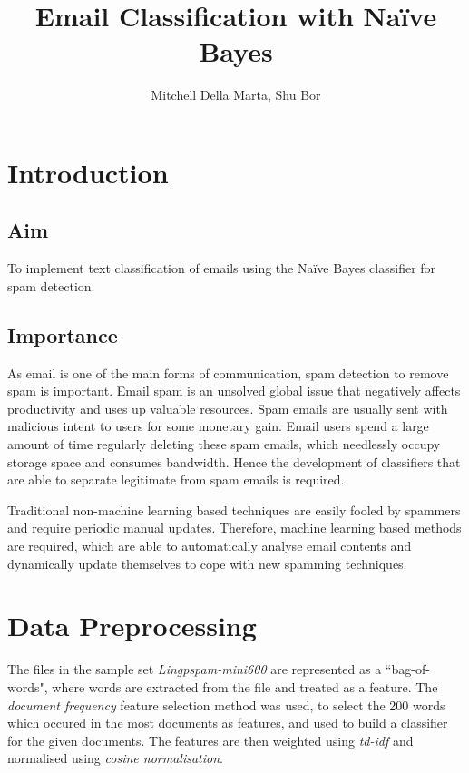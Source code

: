 \documentclass[10pt, a4paper]{article}
\title{Email Classification with Na\"ive Bayes}
\author{Mitchell Della Marta, Shu Bor}
\date{}
\begin{document}
\renewcommand\thetable{\Roman{table}}

\maketitle

\section{Introduction}

\subsection{Aim}

To implement text classification of emails using the Na\"ive Bayes classifier for spam detection.

\subsection{Importance}

As email is one of the main forms of communication, spam detection to remove spam is important. Email spam is an unsolved global issue that negatively affects productivity and uses up valuable resources. Spam emails are usually sent with malicious intent to users for some monetary gain. Email users spend a large amount of time regularly deleting these spam emails, which needlessly occupy storage space and consumes bandwidth. Hence the development of classifiers that are able to separate legitimate from spam emails is required. %

Traditional non-machine learning based techniques are easily fooled by spammers and require periodic manual updates. Therefore, machine learning based methods are required, which are able to automatically analyse email contents and dynamically update themselves to cope with new spamming techniques.

\section{Data Preprocessing}

The files in the sample set \emph{Lingpspam-mini600} are represented as a ``bag-of-words", where words are extracted from the file and treated as a feature. The \emph{document frequency} feature selection method was used, to select the 200 words which occured in the most documents as features, and used to build a classifier for the given documents. The features are then weighted using \emph{td-idf} and normalised using \emph{cosine normalisation}\cite{sebastiani}.
\end{document}
